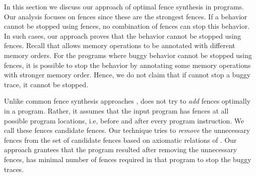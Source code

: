 

In this section we discuss our approach of optimal \mosc fence synthesis 
in \cc programs. 
Our analysis focuses on \mosc fences since these are the strongest \cc 
fences. If a behavior cannot be stopped using \mosc fences, no combination 
of \cc fences can stop this behavior. 
In such cases, our approach proves that the behavior cannot be 
stopped using \cc fences.
Recall that \cc allows memory operations to be annotated with different 
memory orders. For the programs where buggy behavior cannot be stopped 
using fences, it is possible to stop the behavior by annotating some 
memory operations with stronger memory order.
Hence, we do not claim that if \ourtechnique cannot stop a buggy \cc 
trace, it cannot be stopped.

Unlike common fence synthesis approaches , 
\ourtechnique does not try to \emph{add} fences optimally in a program.
Rather, it assumes that the input program has \mosc 
fences at all possible program locations, i.e, before and after every 
program instruction. We call these fences candidate fences. Our technique 
tries to \emph{remove} the unnecessary fences from the set of candidate 
fences based on axiomatic relations of \cc. 
Our approach grantees that the program resulted after removing the 
unnecessary fences, has minimal number of \mosc fences required in that 
program to stop the buggy traces. 

